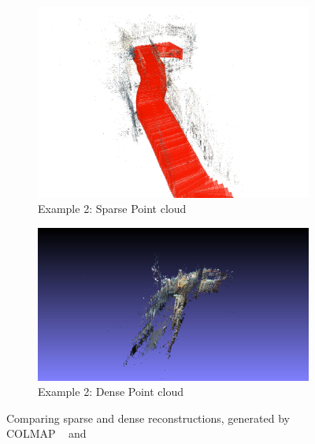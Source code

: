 \documentclass[11pt]{article}
\begin{document}
\begin{figure}
        \vspace{1em}

        \begin{subfigure}{0.45\textwidth}
            \centering
            \includegraphics[width=\linewidth]{images/method/sfm_sparse_2}
            \caption{Example 2: Sparse Point cloud}
        \end{subfigure}
        \hfill
        \begin{subfigure}{0.45\textwidth}
            \centering
            \includegraphics[width=\linewidth]{images/method/sfm_dense_2}
            \caption{Example 2: Dense Point cloud}
        \end{subfigure}

        \caption{Comparing sparse and dense reconstructions, generated by COLMAP ~\cite{schoenberger2016sfm} and ~\cite{schoenberger2016mvs}}
        \label{fig:sfm}
    \end{figure}
\end{document}
